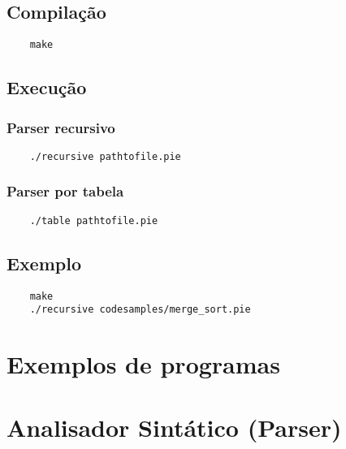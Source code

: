\documentclass[12pt]{report}
\begin{document}
\section{Compilação}
\begin{verbatim}
    make
\end{verbatim}

\section{Execução}
\subsection{Parser recursivo}
\begin{verbatim}
    ./recursive pathtofile.pie
\end{verbatim}

\subsection{Parser por tabela}
\begin{verbatim}
    ./table pathtofile.pie
\end{verbatim}

\section{Exemplo}
\begin{verbatim}
    make
    ./recursive codesamples/merge_sort.pie
\end{verbatim}

\newpage
\chapter{Exemplos de programas}


\newpage
\chapter{Analisador Sintático (Parser)}


\nocite{*}


\end{document}
